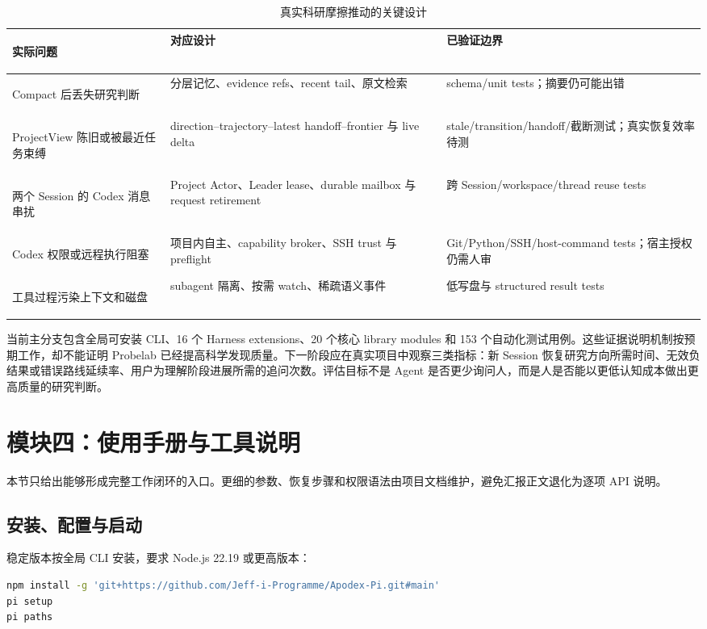 \documentclass[UTF8,11pt,a4paper,fontset=fandol]{ctexart}
\begin{document}
\begin{table}[H]
  \centering
  \caption{真实科研摩擦推动的关键设计}
  \small
  \setlength{\tabcolsep}{4pt}
  \begin{tabularx}{\textwidth}{>{\bfseries\raggedright\arraybackslash}p{3cm}YY}
    \toprule
    实际问题 & 对应设计 & 已验证边界 \\
    \midrule
    Compact 后丢失研究判断 & 分层记忆、evidence refs、recent tail、原文检索 & schema/unit tests；摘要仍可能出错 \\
    ProjectView 陈旧或被最近任务束缚 & direction--trajectory--latest handoff--frontier 与 live delta & stale/transition/handoff/截断测试；真实恢复效率待测 \\
    两个 Session 的 Codex 消息串扰 & Project Actor、Leader lease、durable mailbox 与 request retirement & 跨 Session/workspace/thread reuse tests \\
    Codex 权限或远程执行阻塞 & 项目内自主、capability broker、SSH trust 与 preflight & Git/Python/SSH/host-command tests；宿主授权仍需人审 \\
    工具过程污染上下文和磁盘 & subagent 隔离、按需 watch、稀疏语义事件 & 低写盘与 structured result tests \\
    \bottomrule
  \end{tabularx}
\end{table}

当前主分支包含全局可安装 CLI、16 个 Harness extensions、20 个核心 library modules 和 153 个自动化测试用例。这些证据说明机制按预期工作，却不能证明 Probelab 已经提高科学发现质量。下一阶段应在真实项目中观察三类指标：新 Session 恢复研究方向所需时间、无效负结果或错误路线延续率、用户为理解阶段进展所需的追问次数。评估目标不是 Agent 是否更少询问人，而是人是否能以更低认知成本做出更高质量的研究判断。

\section{模块四：使用手册与工具说明}

本节只给出能够形成完整工作闭环的入口。更细的参数、恢复步骤和权限语法由项目文档维护，避免汇报正文退化为逐项 API 说明。

\subsection{安装、配置与启动}

稳定版本按全局 CLI 安装，要求 Node.js 22.19 或更高版本：

\begin{lstlisting}[language=bash]
npm install -g 'git+https://github.com/Jeff-i-Programme/Apodex-Pi.git#main'
pi setup
pi paths
\end{lstlisting}
\end{document}
